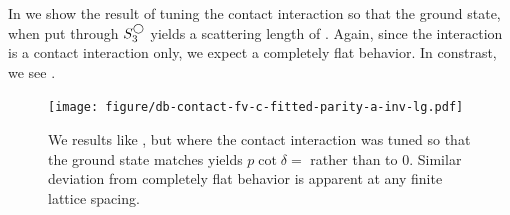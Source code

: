 
In  we show the result of tuning the contact interaction so that the ground state, when put through $S^{\bigcirc}_3$ yields a scattering length of .
Again, since the interaction is a contact interaction only, we expect a completely flat behavior.
In constrast, we see .

\begin{figure}[th]
    \texttt{[image: figure/db-contact-fv-c-fitted-parity-a-inv-lg.pdf]}
    \caption{We results like , but where the contact interaction was tuned so that the ground state matches yields $p\cot\delta = $ rather than to 0.  Similar deviation from completely flat behavior is apparent at any finite lattice spacing.}
    \label{fig:finite a spherical}
\end{figure}

